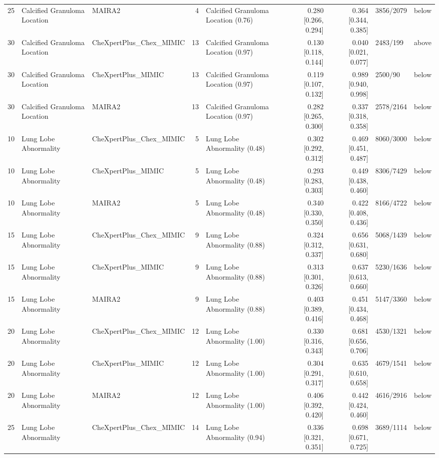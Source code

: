 \begin{table}[t]
\begin{tabular}{lllrlrrll}
25 & Calcified Granuloma Location & MAIRA2 & 4 & Calcified Granuloma Location (0.76) & 0.280 [0.266, 0.294] & 0.364 [0.344, 0.385] & 3856/2079 & below \\
30 & Calcified Granuloma Location & CheXpertPlus\_Chex\_MIMIC & 13 & Calcified Granuloma Location (0.97) & 0.130 [0.118, 0.144] & 0.040 [0.021, 0.077] & 2483/199 & above \\
30 & Calcified Granuloma Location & CheXpertPlus\_MIMIC & 13 & Calcified Granuloma Location (0.97) & 0.119 [0.107, 0.132] & 0.989 [0.940, 0.998] & 2500/90 & below \\
30 & Calcified Granuloma Location & MAIRA2 & 13 & Calcified Granuloma Location (0.97) & 0.282 [0.265, 0.300] & 0.337 [0.318, 0.358] & 2578/2164 & below \\
10 & Lung Lobe Abnormality & CheXpertPlus\_Chex\_MIMIC & 5 & Lung Lobe Abnormality (0.48) & 0.302 [0.292, 0.312] & 0.469 [0.451, 0.487] & 8060/3000 & below \\
10 & Lung Lobe Abnormality & CheXpertPlus\_MIMIC & 5 & Lung Lobe Abnormality (0.48) & 0.293 [0.283, 0.303] & 0.449 [0.438, 0.460] & 8306/7429 & below \\
10 & Lung Lobe Abnormality & MAIRA2 & 5 & Lung Lobe Abnormality (0.48) & 0.340 [0.330, 0.350] & 0.422 [0.408, 0.436] & 8166/4722 & below \\
15 & Lung Lobe Abnormality & CheXpertPlus\_Chex\_MIMIC & 9 & Lung Lobe Abnormality (0.88) & 0.324 [0.312, 0.337] & 0.656 [0.631, 0.680] & 5068/1439 & below \\
15 & Lung Lobe Abnormality & CheXpertPlus\_MIMIC & 9 & Lung Lobe Abnormality (0.88) & 0.313 [0.301, 0.326] & 0.637 [0.613, 0.660] & 5230/1636 & below \\
15 & Lung Lobe Abnormality & MAIRA2 & 9 & Lung Lobe Abnormality (0.88) & 0.403 [0.389, 0.416] & 0.451 [0.434, 0.468] & 5147/3360 & below \\
20 & Lung Lobe Abnormality & CheXpertPlus\_Chex\_MIMIC & 12 & Lung Lobe Abnormality (1.00) & 0.330 [0.316, 0.343] & 0.681 [0.656, 0.706] & 4530/1321 & below \\
20 & Lung Lobe Abnormality & CheXpertPlus\_MIMIC & 12 & Lung Lobe Abnormality (1.00) & 0.304 [0.291, 0.317] & 0.635 [0.610, 0.658] & 4679/1541 & below \\
20 & Lung Lobe Abnormality & MAIRA2 & 12 & Lung Lobe Abnormality (1.00) & 0.406 [0.392, 0.420] & 0.442 [0.424, 0.460] & 4616/2916 & below \\
25 & Lung Lobe Abnormality & CheXpertPlus\_Chex\_MIMIC & 14 & Lung Lobe Abnormality (0.94) & 0.336 [0.321, 0.351] & 0.698 [0.671, 0.725] & 3689/1114 & below \\

\end{tabular}
\end{table}
